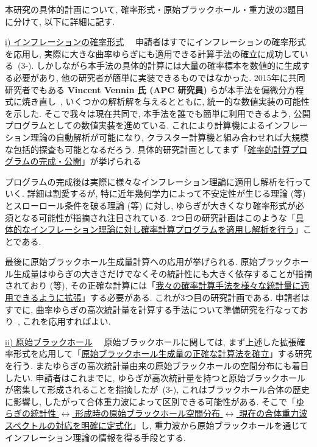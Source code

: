 \documentclass[11pt,a4paper,uplatex,dvipdfmx]{ujarticle} 		%
\newcommand{\研究課題名}{確率解析・原始ブラックホール・重力波観測から迫るインフレーション}
\newcommand{\研究機関名}{名古屋大学}
\newcommand{\研究代表者氏名}{多田祐一郎}
\newcommand{\研究期間の最終元号年度}{6}  %
\renewcommand{\emph}[1]{{\sffamily\gtfamily\bfseries #1}}
\newcommand{\stochastic}[1]{\noindent \colorbox{stochastic}{\ul{i) #1}}~~}
\newcommand{\PBH}[1]{\noindent\colorbox{PBH}{\ul{ii) #1}}~~}
\begin{document}
\noindent
本研究の具体的計画について, 確率形式・原始ブラックホール・重力波の3題目に分けて, 以下に詳細に記す.

\stochastic{インフレーションの確率形式}
申請者はすでにインフレーションの確率形式を応用し, 実際に大きな曲率ゆらぎにも適用できる計算手法の確立に成功している~(3-\cite{Fujita:2013cna,Fujita:2014tja}).
しかしながら本手法の具体的計算には大量の確率標本を数値的に生成する必要があり, 他の研究者が簡単に実装できるものではなかった. 
2015年に共同研究者でもある \emph{Vincent Vennin 氏 (APC 研究員)} らが本手法を偏微分方程式に焼き直し~\cite{Vennin:2015hra}, 
いくつかの解析解を与えるとともに, 統一的な数値実装の可能性を示した. そこで我々は現在共同で, 本手法を誰でも簡単に利用できるよう, 
公開プログラムとしての数値実装を進めている. 
これにより計算機によるインフレーション理論の自動解析が可能になり, クラスター計算機と組み合わせれば大規模な包括的探査も可能となるだろう.
具体的研究計画としてまず「\ul{確率的計算プログラムの完成・公開}」が挙げられる

プログラムの完成後は実際に様々なインフレーション理論に適用し解析を行っていく. 詳細は割愛するが, 特に近年幾何学力によって不安定性が生じる理論 
(\cite{Renaux-Petel:2015mga}等) とスローロール条件を破る理論 (\cite{Ezquiaga:2018gbw}等) に対し, 
ゆらぎが大きくなり確率形式が必須となる可能性が指摘され注目されている.
2つ目の研究計画はこのような「\ul{具体的なインフレーション理論に対し確率計算プログラムを適用し解析を行う}」ことである.

最後に原始ブラックホール生成量計算への応用が挙げられる.
原始ブラックホール生成量はゆらぎの大きさだけでなくその統計性にも大きく依存することが指摘されており (\cite{Ezquiaga:2019ftu}等),
その正確な計算には「\ul{我々の確率計算手法を様々な統計量に適用できるように拡張}」する必要がある.
これが3つ目の研究計画である. 申請者はすでに, 曲率ゆらぎの高次統計量を計算する手法について準備研究を行なっており~\cite{Tada:2016pmk,Suyama:2020akr}, これを応用すればよい.

\medskip


\PBH{原始ブラックホール}
原始ブラックホールに関しては, まず上述した拡張確率形式を応用して「\ul{原始ブラックホール生成量の正確な計算法を確立}」する研究を行う.
またゆらぎの高次統計量由来の原始ブラックホールの空間分布にも着目したい.
申請者はこれまでに, ゆらぎが高次統計量を持つと原始ブラックホールが密集して形成されることを指摘したが~(3-\cite{Tada:2015noa}),
これはブラックホール合体の歴史に影響し, したがって合体重力波によって区別できる可能性がある.
そこで「\ul{ゆらぎの統計性 {$\leftrightarrow$} 形成時の原始ブラックホール空間分布 {$\leftrightarrow$} 現在の合体重力波スペクトルの対応を明確に定式化}」し, 
重力波から原始ブラックホールを通じてインフレーション理論の情報を得る手段とする.
\end{document}
